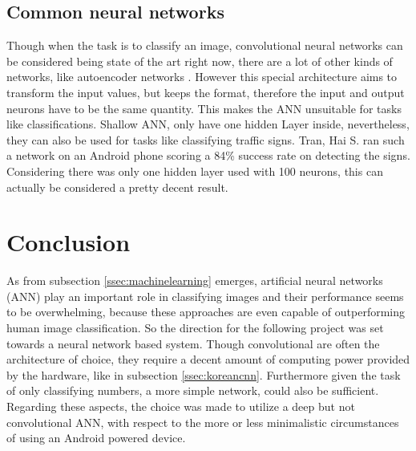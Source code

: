 \subsection{Common neural networks}
Though when the task is to classify an image, convolutional neural networks can be considered being state of the art right now, there are a lot of other kinds of networks, like autoencoder networks \cite{bengio}. However this special architecture aims to transform the input values, but keeps the format, therefore the input and output neurons have to be the same quantity. This makes the ANN unsuitable for tasks like classifications.\newline
Shallow ANN, only have one hidden Layer inside, nevertheless, they can also be used for tasks like classifying traffic signs. Tran, Hai S. ran such a network on an Android phone scoring a 84\% success rate on detecting the signs\cite{tran}. Considering there was only one hidden layer used with 100 neurons, this can actually be considered a pretty decent result.

\section{Conclusion}
As from subsection \ref{ssec:machinelearning} emerges, artificial neural networks (ANN) play an important role in classifying images and their performance seems to be overwhelming, because these approaches are even capable of outperforming human image classification. So the direction for the following project was set towards a neural network based system. Though convolutional are often the architecture of choice, they require a decent amount of computing power provided by the hardware, like in subsection \ref{ssec:koreancnn}. Furthermore given the task of only classifying numbers, a more simple network, could also be sufficient. Regarding these aspects, the choice was made to utilize a deep but not convolutional ANN, with respect to the more or less minimalistic circumstances of using an Android powered device.